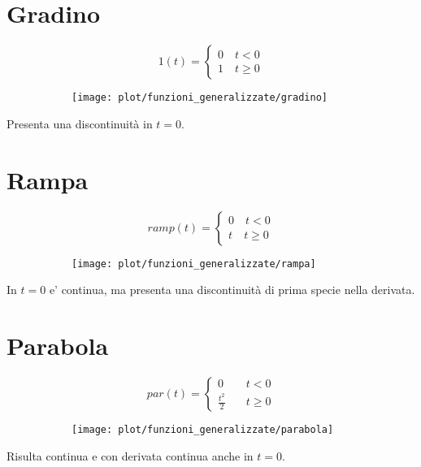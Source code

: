 \documentclass[../main.tex]{subfiles}
\begin{document}
	\section{Gradino}
	\begin{figure}[h!]
		\centering
		\begin{subfigure}{0.4\textwidth}
			\[
				1(t) = 
				\begin{cases}
					0 \quad t<0\\
					1 \quad t \geq 0
				\end{cases}
			\]
		\end{subfigure}
		\begin{subfigure}{0.4\textwidth}
			\texttt{[image: plot/funzioni\_generalizzate/gradino]}
		\end{subfigure}
	\end{figure}
	Presenta una discontinuità in $t=0$.
	\section{Rampa}
	\begin{figure}[h!]
		\centering
		\begin{subfigure}{0.4\textwidth}
			\[
				ramp(t)=
				\begin{cases}
					0 \quad t<0\\
					t \quad t \geq 0			
				\end{cases}
			\]
		\end{subfigure}
		\begin{subfigure}{0.4\textwidth}
			\texttt{[image: plot/funzioni\_generalizzate/rampa]}
		\end{subfigure}
	\end{figure}
	In $t=0$ e' continua, ma presenta una discontinuità di prima specie nella derivata.
	\section{Parabola}
	\begin{figure}[h!]
		\centering
		\begin{subfigure}{0.4\textwidth}
			\[
				par(t)=
				\begin{cases}
					0 \quad &t<0\\
					\frac{t^2}{2} \quad &t\geq 0
				\end{cases}
			\]
		\end{subfigure}
		\begin{subfigure}{0.4\textwidth}
			\texttt{[image: plot/funzioni\_generalizzate/parabola]}
		\end{subfigure}
	\end{figure}
	Risulta continua e con derivata continua anche in $t=0$.	
\end{document}
